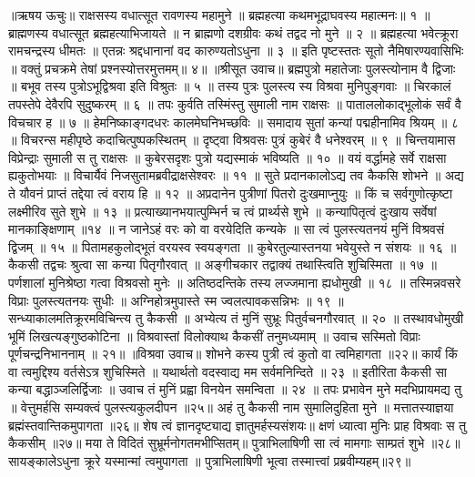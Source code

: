 ॥ऋषय ऊचुः॥
राक्षसस्य वधात्सूत रावणस्य महामुने ॥
ब्रह्महत्या कथमभूद्राघवस्य महात्मनः॥ १ ॥
ब्राह्मणस्य वधात्सूत ब्रह्महत्याभिजायते ॥
न ब्राह्मणो दशग्रीवः कथं तद्वद नो मुने ॥ २ ॥
ब्रह्महत्या भवेत्क्रूरा रामचन्द्रस्य धीमतः ॥
एतन्नः श्रद्दधानानां वद कारुण्यतोऽधुना ॥ ३ ॥
इति पृष्टस्ततः सूतो नैमिषारण्यवासिभिः ॥
वक्तुं प्रचक्रमे तेषां प्रश्नस्योत्तरमुत्तमम्॥ ४॥
॥श्रीसूत उवाच॥
ब्रह्मपुत्रो महातेजाः पुलस्त्योनाम वै द्विजाः ॥
बभूव तस्य पुत्रोऽभूद्विश्रवा इति विश्रुतः ॥ ५ ॥
तस्य पुत्रः पुलस्त्य स्य विश्रवा मुनिपुङ्गवाः ॥
चिरकालं तपस्तेपे देवैरपि सुदुष्करम् ॥ ६ ॥
तपः कुर्वति तस्मिंस्तु सुमाली नाम राक्षसः ॥
पाताललोकाद्भूलोकं सर्वं वै विचचार ह ॥ ७ ॥
हेमनिष्काङ्गदधरः कालमेघनिभच्छविः ॥
समादाय सुतां कन्यां पद्महीनामिव श्रियम् ॥ ८ ॥
विचरन्स महीपृष्ठे कदाचित्पुष्पकस्थितम् ॥
दृष्ट्वा विश्रवसः पुत्रं कुबेरं वै धनेश्वरम् ॥ ९ ॥
चिन्तयामास विप्रेन्द्राः सुमाली स तु राक्षसः ॥
कुबेरसदृशः पुत्रो यद्यस्माकं भविष्यति ॥ १० ॥
वयं वर्द्धामहे सर्वे राक्षसा ह्यकुतोभयाः ॥
विचार्यैवं निजसुतामब्रवीद्राक्षसेश्वरः ॥ ११ ॥
सुते प्रदानकालोऽद्य तव कैकसि शोभने ॥
अद्य ते यौवनं प्राप्तं तद्देया त्वं वराय हि ॥ १२ ॥
अप्रदानेन पुत्रीणां पितरो दुःखमाप्नुयुः ॥
किं च सर्वगुणोत्कृष्टा लक्ष्मीरिव सुते शुभे ॥ १३ ॥
प्रत्याख्यानभयात्पुम्भिर्न च त्वं प्रार्थ्यसे शुभे ॥
कन्यापितृत्वं दुःखाय सर्वेषां मानकाङ्क्षिणाम् ॥१४ ॥
न जानेऽहं वरः को वा वरयेदिति कन्यके ॥
सा त्वं पुलस्त्यतनयं मुनिं विश्रवसं द्विजम् ॥ १५ ॥
पितामहकुलोद्भूतं वरयस्व स्वयङ्गता ॥
कुबेरतुल्यास्तनया भवेयुस्ते न संशयः ॥ १६ ॥
कैकसी तद्वचः श्रुत्वा सा कन्या पितृगौरवात् ॥
अङ्गीचकार तद्वाक्यं तथास्त्विति शुचिस्मिता ॥ १७ ॥
पर्णशालां मुनिश्रेष्ठा गत्वा विश्रवसो मुनेः ॥
अतिष्ठदन्तिके तस्य लज्जमाना ह्यधोमुखी ॥ १८ ॥
तस्मिन्नवसरे विप्राः पुलस्त्यतनयः सुधीः ॥
अग्निहोत्रमुपास्ते स्म ज्वलत्पावकसन्निभः ॥ १९ ॥
सन्ध्याकालमतिक्रूरमविचिन्त्य तु कैकसी ॥
अभ्येत्य तं मुनिं सुभ्रूः पितुर्वचनगौरवात् ॥ २० ॥
तस्थावधोमुखी भूमिं लिखत्यङ्गुष्ठकोटिना ॥
विश्रवास्तां विलोक्याथ कैकसीं तनुमध्यमाम् ॥
उवाच सस्मितो विप्राः पूर्णचन्द्रनिभाननाम् ॥ २१॥
॥विश्रवा उवाच॥
शोभने कस्य पुत्री त्वं कुतो वा त्वमिहागता ॥२२॥
कार्यं किं वा त्वमुद्दिश्य वर्तसेऽत्र शुचिस्मिते ॥
यथार्थतो वदस्वाद्य मम सर्वमनिन्दिते ॥ २३ ॥
इतीरिता कैकसी सा कन्या बद्धाञ्जलिर्द्विजाः ॥
उवाच तं मुनिं प्रह्वा विनयेन समन्विता ॥ २४ ॥
तपः प्रभावेन मुने मदभिप्रायमद्य तु ॥
वेत्तुमर्हसि सम्यक्त्वं पुलस्त्यकुलदीपन ॥२५॥
अहं तु कैकसी नाम सुमालिदुहिता मुने ॥
मत्तातस्याज्ञया ब्रह्मंस्तवान्तिकमुपागता ॥२६॥
शेष त्वं ज्ञानदृष्ट्याद्य ज्ञातुमर्हस्यसंशयः॥
क्षणं ध्यात्वा मुनिः प्राह विश्रवाः स तु कैकसीम् ॥२७॥
मया ते विदितं सुभ्रूर्मनोगतमभीप्सितम्॥
पुत्राभिलाषिणी सा त्वं मामगाः साम्प्रतं शुभे ॥२८॥
सायङ्कालेऽधुना क्रूरे यस्मान्मां त्वमुपागता ॥
पुत्राभिलाषिणी भूत्वा तस्मात्त्वां प्रब्रवीम्यहम्॥२९॥
